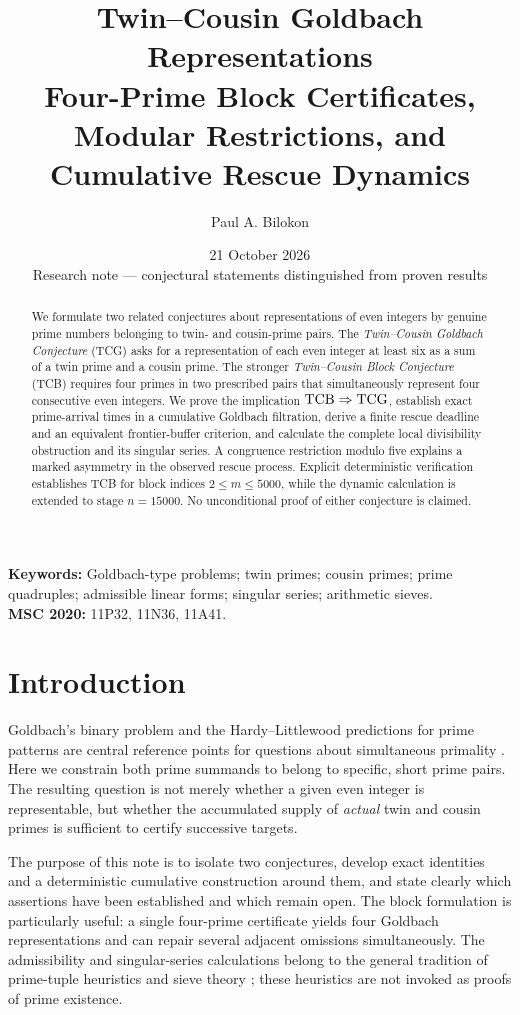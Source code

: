 \documentclass[11pt,a4paper]{article}
\title{\bfseries Twin--Cousin Goldbach Representations\\[3pt]
\large Four-Prime Block Certificates, Modular Restrictions, and Cumulative Rescue Dynamics}
\author{Paul A. Bilokon}
\date{21 October 2026\\\small Research note --- conjectural statements distinguished from proven results}
\numberwithin{equation}{section}
\theoremstyle{definition}
\newcommand{\TCG}{\textup{TCG}}
\newcommand{\TCB}{\textup{TCB}}
\begin{document}
\maketitle
\begin{abstract}
We formulate two related conjectures about representations of even integers by genuine prime numbers belonging to twin- and cousin-prime pairs. The \emph{Twin--Cousin Goldbach Conjecture} (TCG) asks for a representation of each even integer at least six as a sum of a twin prime and a cousin prime. The stronger \emph{Twin--Cousin Block Conjecture} (TCB) requires four primes in two prescribed pairs that simultaneously represent four consecutive even integers. We prove the implication \(\TCB\Rightarrow\TCG\), establish exact prime-arrival times in a cumulative Goldbach filtration, derive a finite rescue deadline and an equivalent frontier-buffer criterion, and calculate the complete local divisibility obstruction and its singular series. A congruence restriction modulo five explains a marked asymmetry in the observed rescue process. Explicit deterministic verification establishes TCB for block indices \(2\le m\le5000\), while the dynamic calculation is extended to stage \(n=15000\). No unconditional proof of either conjecture is claimed.
\end{abstract}
\noindent\textbf{Keywords:} Goldbach-type problems; twin primes; cousin primes; prime quadruples; admissible linear forms; singular series; arithmetic sieves.\\
\textbf{MSC 2020:} 11P32, 11N36, 11A41.

\section{Introduction}
Goldbach's binary problem and the Hardy--Littlewood predictions for prime patterns are central reference points for questions about simultaneous primality \cite{HardyLittlewood1923}. Here we constrain both prime summands to belong to specific, short prime pairs. The resulting question is not merely whether a given even integer is representable, but whether the accumulated supply of \emph{actual} twin and cousin primes is sufficient to certify successive targets.

The purpose of this note is to isolate two conjectures, develop exact identities and a deterministic cumulative construction around them, and state clearly which assertions have been established and which remain open. The block formulation is particularly useful: a single four-prime certificate yields four Goldbach representations and can repair several adjacent omissions simultaneously. The admissibility and singular-series calculations belong to the general tradition of prime-tuple heuristics and sieve theory \cite{SchinzelSierpinski1958,HalberstamRichert1974,Garcia2024}; these heuristics are not invoked as proofs of prime existence.
\end{document}
